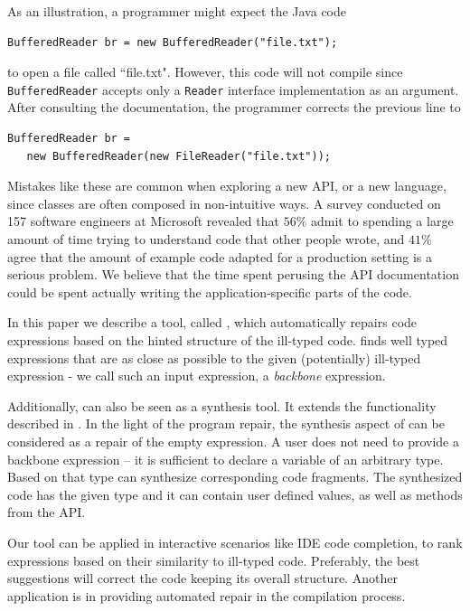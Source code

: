 As an illustration, a programmer might expect the Java code
\begin{lstlisting}
BufferedReader br = new BufferedReader("file.txt");
\end{lstlisting}
to open a file called ``file.txt". However, this code will not compile since \texttt{BufferedReader} accepts only a \texttt{Reader} interface implementation as an argument. After consulting the documentation, the programmer corrects the previous line to
\begin{lstlisting}
BufferedReader br = 
   new BufferedReader(new FileReader("file.txt"));
\end{lstlisting}
Mistakes like these are common when exploring a new API, or a new language, 
since classes are often composed in non-intuitive ways. A survey conducted on 
157 software engineers at Microsoft \cite{LaToza:2006} revealed that
$56\%$ admit to spending a large amount of time trying to understand code that other people wrote, and $41\%$ agree that the amount of example code adapted for a production setting is a serious problem. We believe that the time spent perusing the API documentation could be spent actually writing the application-specific parts of the code. 

In this paper we describe a tool, called \ourTool, which
automatically repairs code expressions based on the hinted structure
of the ill-typed code. \ourTool finds well typed expressions that are as close as 
possible to the given (potentially) ill-typed expression - we call such an
input expression, a {\em backbone} expression. 

Additionally, \ourTool can also be 
seen as a synthesis tool. It extends the functionality described in \cite{MandelinetALL2005Jungloid, GveroETAL13CompleteCompletionTypesWeights, PerelmanGBG12}.
In the light of the program repair, the synthesis aspect of \ourTool can be 
considered as a repair of the empty expression. A user does not need to provide a backbone expression -- it is sufficient to declare a variable of an arbitrary type. Based on that type \ourTool can synthesize corresponding code fragments. The synthesized code has the given type and it can contain user defined 
values, as well as methods from the API. 

Our tool can be applied in interactive scenarios like IDE code completion, to rank expressions 
based on their similarity to ill-typed code. Preferably, the best
suggestions will correct the code keeping its overall structure.
Another application is in providing automated repair in the compilation process.


